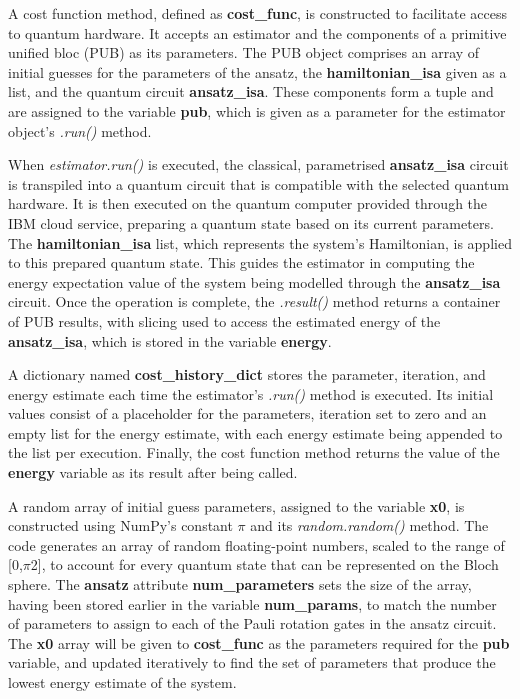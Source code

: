 \documentclass{article}
\begin{document}
A cost function method, defined as \textbf{cost\_func}, is constructed to facilitate access to quantum hardware. It accepts an estimator and the components of a primitive unified bloc (PUB) as its parameters. The PUB object comprises an array of initial guesses for the parameters of the ansatz, the \textbf{hamiltonian\_isa} given as a list, and the quantum circuit \textbf{ansatz\_isa}. These components form a tuple and are assigned to the variable \textbf{pub}, which is given as a parameter for the estimator object's \textit{.run()} method. 

When \textit{estimator.run()} is executed, the classical, parametrised \textbf{ansatz\_isa} circuit is transpiled into a quantum circuit that is compatible with the selected quantum hardware. It is then executed on the quantum computer provided through the IBM cloud service, preparing a quantum state based on its current parameters. The \textbf{hamiltonian\_isa} list, which represents the system's Hamiltonian, is applied to this prepared quantum state. This guides the estimator in computing the energy expectation value of the system being modelled through the \textbf{ansatz\_isa} circuit. Once the operation is complete, the \textit{.result()} method returns a container of PUB results\cite{PrimitiveResult}, with slicing used to access the estimated energy of the \textbf{ansatz\_isa}, which is stored in the variable \textbf{energy}.

A dictionary named \textbf{cost\_history\_dict} stores the parameter, iteration, and energy estimate each time the estimator's \textit{.run()} method is executed. Its initial values consist of a placeholder for the parameters, iteration set to zero and an empty list for the energy estimate, with each energy estimate being appended to the list per execution. Finally, the cost function method returns the value of the \textbf{energy} variable as its result after being called.

A random array of initial guess parameters, assigned to the variable \textbf{x0}, is constructed using NumPy’s constant $\pi$ and its \textit{random.random()} method. The code generates an array of random floating-point numbers, scaled to the range of [0,$\pi$2], to account for every quantum state that can be represented on the Bloch sphere. The \textbf{ansatz} attribute \textbf{num\_parameters} sets the size of the array, having been stored earlier in the variable \textbf{num\_params}, to match the number of parameters to assign to each of the Pauli rotation gates in the ansatz circuit. The \textbf{x0} array will be given to \textbf{cost\_func} as the parameters required for the \textbf{pub} variable, and updated iteratively to find the set of parameters that produce the lowest energy estimate of the system.
\end{document}
